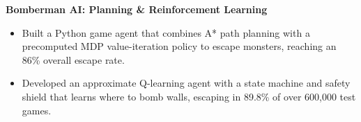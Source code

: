\textbf{Bomberman AI: Planning \& Reinforcement Learning}
\begin{itemize}
  \item Built a Python game agent that combines A* path planning with a precomputed MDP value-iteration policy to escape monsters, reaching an 86\% overall escape rate.
  \item Developed an approximate Q-learning agent with a state machine and safety shield that learns where to bomb walls, escaping in 89.8\% of over 600,000 test games.
\end{itemize}
